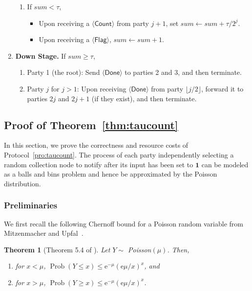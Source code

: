 \documentclass[11pt,letter]{article}
\newcommand{\e}{\mathrm{e}}
\DeclareMathOperator*{\Prob}{Prob}
\theoremstyle{mytheoremstyle}
\newtheorem{theorem}{Theorem}
\newcommand{\flag}{$\langle\mathsf{Flag}\rangle$\xspace}
\newcommand{\countm}{$\langle\mathsf{Count}\rangle$\xspace}
\newcommand{\done}{$\langle\mathsf{Done}\rangle$\xspace}
\begin{document}
\begin{algorithm}
\begin{enumerate}
\begin{enumerate}
			\item If $sum < \tau$,
			\begin{itemize}
				\item Upon receiving a \countm from party $j+1$, set $sum \gets sum + \tau/2^j$.
				\item Upon receiving a \flag, $sum \gets sum+1$.
			\end{itemize}
		\end{enumerate}
		\item \textbf{Down Stage.} If $sum \ge \tau$,
		\begin{enumerate}
			\item Party 1 (the root): Send \done to parties 2 and 3, and then terminate.
			\item Party $j$ for $j>1$: Upon receiving \done from party $\lfloor j/2 \rfloor$, forward it to parties $2j$ and $2j+1$ (if they exist), and then terminate.
		\end{enumerate}
	\end{enumerate}
	\label{pro:taucount}
\end{algorithm}

\subsection{Proof of Theorem~\ref{thm:taucount}} \label{sec:tc-proofs}
In this section, we prove the correctness and resource costs of Protocol~\ref{pro:taucount}.
The process of each party independently selecting a random collection node to notify after its input has been set to $\mathbf{1}$ can be modeled as a balls and bins problem and hence be approximated by the Poisson distribution.

\subsubsection{Preliminaries}
We first recall the following Chernoff bound for a Poisson random variable from Mitzenmacher and Upfal~\cite{opac-b1117540}. 

\begin{theorem}[Theorem 5.4 of \cite{opac-b1117540}]\label{thm:CherPois}
	Let $Y \sim$ Poisson$(\mu)$. Then,
	\begin{enumerate}
		\item for $x < \mu$, $\Prob(Y \le x)\le \e^{-\mu}(\e \mu/x)^{x}$, and
		\item for $x > \mu$, $\Prob(Y \ge x)\le \e^{-\mu}(\e \mu/x)^{x}$.
	\end{enumerate}
\end{theorem}
\end{document}
